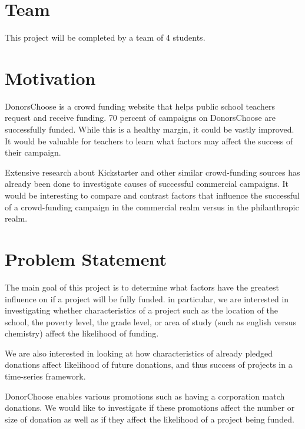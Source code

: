 \documentclass{article}
\begin{document}
 


\section{Team}
This project will be completed by a team of 4 students.

\section{Motivation}
DonorsChoose is a crowd funding website that helps public school teachers request and receive funding. 70 percent of campaigns on DonorsChoose are successfully funded. While this is a healthy margin, it could be vastly improved. It would be valuable for teachers to learn what factors may affect the success of their campaign.  

Extensive research about Kickstarter and other similar crowd-funding sources has already been done to investigate causes of successful commercial campaigns. It would be interesting to compare and contrast factors that influence the successful of a crowd-funding campaign in the commercial realm versus in the philanthropic realm.

\section{Problem Statement}
The main goal of this project is to determine what factors have the greatest influence on if a project will be fully funded.  in particular, we are interested in investigating whether characteristics of a project such as the location of the school, the poverty level, the grade level, or area of study (such as english versus chemistry) affect the likelihood of funding.  

We are also interested in looking at how characteristics of already pledged donations affect likelihood of future donations, and thus success of projects in a time-series framework.

DonorChoose enables various promotions such as having a corporation match donations.  We would like to investigate if these promotions affect the number or size of donation as well as if they affect the likelihood of a project being funded.
\end{document}
